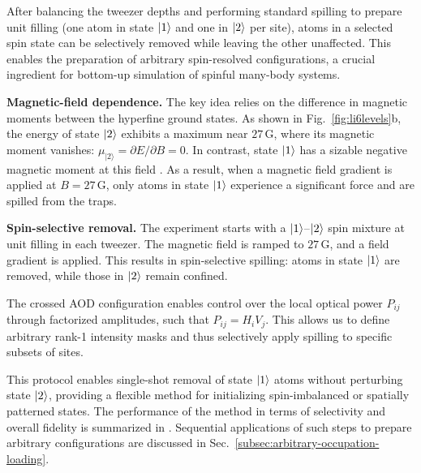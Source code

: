 After balancing the tweezer depths and performing standard spilling to prepare unit filling (one atom in state $\left| 1 \right\rangle$ and one in $\left| 2 \right\rangle$ per site), atoms in a selected spin state can be selectively removed while leaving the other unaffected. This enables the preparation of arbitrary spin-resolved configurations, a crucial ingredient for bottom-up simulation of spinful many-body systems.

\textbf{Magnetic-field dependence.}
The key idea relies on the difference in magnetic moments between the hyperfine ground states. As shown in Fig.~\ref{fig:li6levels}b, the energy of state $\left| 2 \right\rangle$ exhibits a maximum near $27\,\mathrm{G}$, where its magnetic moment vanishes: $\mu_{|2\rangle} = \partial E / \partial B = 0$. In contrast, state $\left| 1 \right\rangle$ has a sizable negative magnetic moment at this field . As a result, when a magnetic field gradient is applied at $B = 27\,\mathrm{G}$, only atoms in state $\left| 1 \right\rangle$ experience a significant force and are spilled from the traps.

\textbf{Spin-selective removal.}
The experiment starts with a $\left| 1 \right\rangle$–$\left| 2 \right\rangle$ spin mixture at unit filling in each tweezer. The magnetic field is ramped to $27\,\mathrm{G}$, and a field gradient is applied. This results in spin-selective spilling: atoms in state $\left| 1 \right\rangle$ are removed, while those in $\left| 2 \right\rangle$ remain confined.

The crossed AOD configuration enables control over the local optical power $P_{ij}$ through factorized amplitudes, such that $P_{ij} = H_i V_j$. This allows us to define arbitrary rank-1 intensity masks and thus selectively apply spilling to specific subsets of sites. 

This protocol enables single-shot removal of state $\left| 1 \right\rangle$ atoms without perturbing state $\left| 2 \right\rangle$, providing a flexible method for initializing spin-imbalanced or spatially patterned states. The performance of the method in terms of selectivity and overall fidelity is summarized in . Sequential applications of such steps to prepare arbitrary configurations are discussed in Sec.~\ref{subsec:arbitrary-occupation-loading}.
